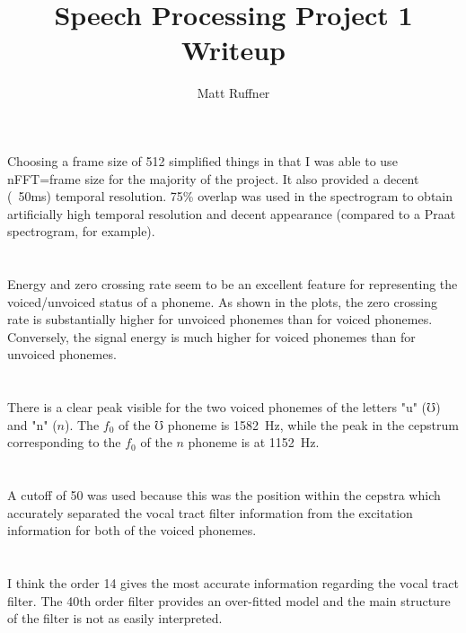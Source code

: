 \documentclass[letterpaper]{article}
\title{Speech Processing Project 1 Writeup}
\author{Matt Ruffner}
\begin{document}
\maketitle

\section{}
Choosing a frame size of 512 simplified things in that I was able to use nFFT=frame size for the majority of the project. It also provided a decent (~50ms) temporal resolution. 75\% overlap was used in the spectrogram to obtain artificially high temporal resolution and decent appearance (compared to a Praat spectrogram, for example).

\section{}
Energy and zero crossing rate seem to be an excellent feature for representing the voiced/unvoiced status of a phoneme. As shown in the plots, the zero crossing rate is substantially higher for unvoiced phonemes than for voiced phonemes. Conversely, the signal energy is much higher for voiced phonemes than for unvoiced phonemes.


\section{}
There is a clear peak visible for the two voiced phonemes of the letters "u" ($\mho$) and "n" ($n$). The $f_0$ of the $\mho$ phoneme is 1582~Hz, while the peak in the cepstrum corresponding to the $f_0$ of the $n$ phoneme is at 1152~Hz.


\section{}
A cutoff of 50 was used because this was the position within the cepstra which accurately separated the vocal tract filter information from the excitation information for both of the voiced phonemes.

\section{}
I think the order 14 gives the most accurate information regarding the vocal tract filter. The 40th order filter provides an over-fitted model and the main structure of the filter is not as easily interpreted.
\end{document}
